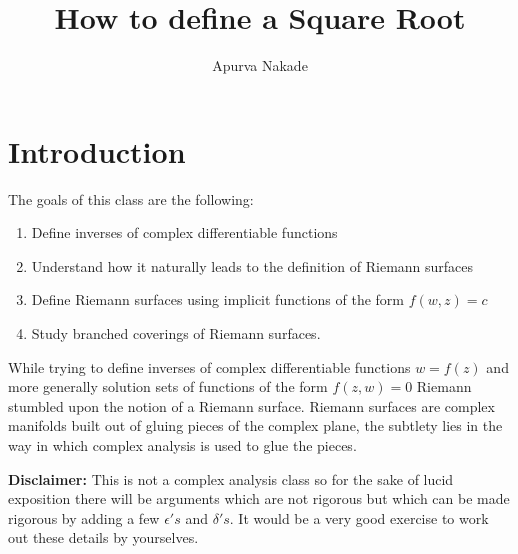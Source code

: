 \DeclareMathOperator{\re}{Re}




\title{How to define a Square Root}
\author{Apurva Nakade}
\thispagestyle{fancy}
\maketitle




\section{Introduction}

The goals of this class are the following:
\begin{enumerate}
	\item Define inverses of complex differentiable functions
	\item Understand how it naturally leads to the definition of Riemann surfaces
	\item Define Riemann surfaces using implicit functions of the form $f(w,z) = c$
	\item Study branched coverings of Riemann surfaces.
\end{enumerate}

While trying to define inverses of complex differentiable functions $w = f(z)$ and more generally solution sets of functions of the form $f(z,w)=0$ Riemann stumbled upon the notion of a Riemann surface. Riemann surfaces are complex manifolds built out of gluing pieces of the complex plane, the subtlety lies in the way in which complex analysis is used to glue the pieces.

\textbf{Disclaimer:} This is not a complex analysis class so for the sake of lucid exposition there will be arguments which are not rigorous but which can be made rigorous by adding a few $\epsilon's$ and $\delta's$. It would be a very good exercise to work out these details by yourselves.\\

